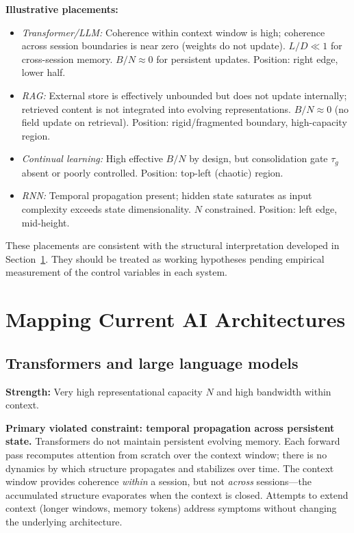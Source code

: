 \documentclass[12pt]{article}
\begin{document}
\textbf{Illustrative placements:}
\begin{itemize}
  \item \emph{Transformer/LLM:} Coherence within context window is high; coherence across session boundaries is near zero (weights do not update). $L/D \ll 1$ for cross-session memory. $B/N \approx 0$ for persistent updates. Position: right edge, lower half.
  \item \emph{RAG:} External store is effectively unbounded but does not update internally; retrieved content is not integrated into evolving representations. $B/N \approx 0$ (no field update on retrieval). Position: rigid/fragmented boundary, high-capacity region.
  \item \emph{Continual learning:} High effective $B/N$ by design, but consolidation gate $\tau_g$ absent or poorly controlled. Position: top-left (chaotic) region.
  \item \emph{RNN:} Temporal propagation present; hidden state saturates as input complexity exceeds state dimensionality. $N$ constrained. Position: left edge, mid-height.
\end{itemize}

These placements are consistent with the structural interpretation developed in Section~\ref{sec:architectures}. They should be treated as working hypotheses pending empirical measurement of the control variables in each system.

\section{Mapping Current AI Architectures}
\label{sec:architectures}

\subsection{Transformers and large language models}

\textbf{Strength:} Very high representational capacity $N$ and high bandwidth within context.

\textbf{Primary violated constraint: temporal propagation across persistent state.} Transformers do not maintain persistent evolving memory. Each forward pass recomputes attention from scratch over the context window; there is no dynamics by which structure propagates and stabilizes over time. The context window provides coherence \emph{within} a session, but not \emph{across} sessions---the accumulated structure evaporates when the context is closed. Attempts to extend context (longer windows, memory tokens) address symptoms without changing the underlying architecture.
\end{document}
